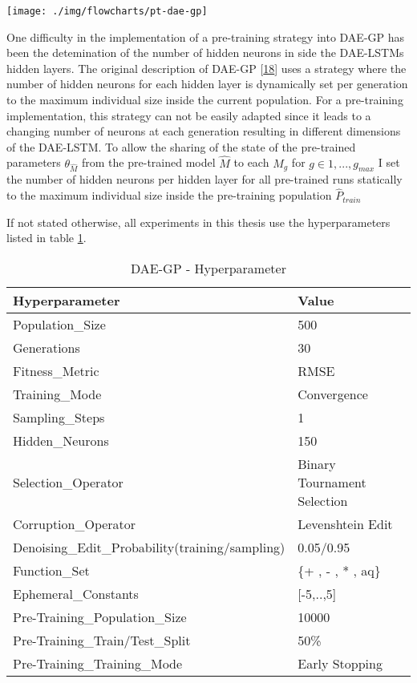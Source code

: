 \documentclass[
  11pt,
]{article}
\let\origfigure\figure
\let\endorigfigure\endfigure
\renewenvironment{figure}[1][2] {
    \expandafter\origfigure\expandafter[H]
} {
    \endorigfigure
}
\begin{document}
\begin{figure}[c]

{\centering \texttt{[image: ./img/flowcharts/pt-dae-gp]} 

}

\caption{Pre-Trained DAE-GP Flowchart}\label{fig:pt-daegp-flowchart}
\end{figure}

One difficulty in the implementation of a pre-training strategy into DAE-GP has been the detemination of the number of hidden neurons in side the DAE-LSTMs hidden layers. The original description of DAE-GP {[}\protect\hyperlink{ref-dae-gp_2020_rtree}{18}{]} uses a strategy where the number of hidden neurons for each hidden layer is dynamically set per generation to the maximum individual size inside the current population.
For a pre-training implementation, this strategy can not be easily adapted since it leads to a changing number of neurons at each generation resulting in different dimensions of the DAE-LSTM. To allow the sharing of the state of the pre-trained parameters \(\theta_{\hat{M}}\) from the pre-trained model \(\hat{M}\) to each \(M_g\) for \(g\in{1,...,g_{max}}\) I set the number of hidden neurons per hidden layer for all pre-trained runs statically to the maximum individual size inside the pre-training population \(\hat{P}_{train}\)

If not stated otherwise, all experiments in this thesis use the hyperparameters listed in table \ref{tab:airfoil-fullRun-2hl-maxIndSize-params}.

\begin{table}

\caption{\label{tab:airfoil-fullRun-2hl-maxIndSize-params}DAE-GP - Hyperparameter}
\centering
\begin{tabular}[t]{l|l}
\hline
\textbf{Hyperparameter} & \textbf{Value}\\
\hline
Population\_Size & 500\\
\hline
Generations & 30\\
\hline
Fitness\_Metric & RMSE\\
\hline
Training\_Mode & Convergence\\
\hline
Sampling\_Steps & 1\\
\hline
Hidden\_Neurons & 150\\
\hline
Selection\_Operator & Binary Tournament Selection\\
\hline
Corruption\_Operator & Levenshtein Edit\\
\hline
Denoising\_Edit\_Probability(training/sampling) & 0.05/0.95\\
\hline
Function\_Set & \{+ , - , * , aq\}\\
\hline
Ephemeral\_Constants & [-5,..,5]\\
\hline
Pre-Training\_Population\_Size & 10000\\
\hline
Pre-Training\_Train/Test\_Split & 50\%\\
\hline
Pre-Training\_Training\_Mode & Early Stopping\\
\hline
\end{tabular}
\end{table}
\end{document}
